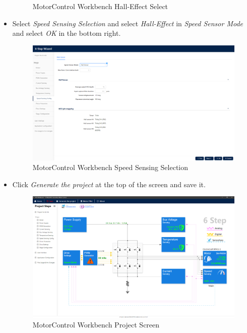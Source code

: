 \documentclass[10pt]{article}
\begin{document}
\begin{itemize}
\begin{figure}[H]
                        \caption{MotorControl Workbench Hall-Effect Select}
                    \end{figure}
                \item Select \emph{Speed Sensing Selection} and select \emph{Hall-Effect} in \emph{Speed Sensor Mode} and select \emph{OK} in the bottom right.
                    \begin{figure}[H]
                        \centerline{\includegraphics[width=\textwidth]{References/MCW 6-step Speed Sensing Selection.png}}
                        \caption{MotorControl Workbench Speed Sensing Selection}
                    \end{figure}
                \item Click \emph{Generate the project} at the top of the screen and save it.
                    \begin{figure}[H]
                        \centerline{\includegraphics[width=\textwidth]{References/MCW Project Screen.png}}
                        \caption{MotorControl Workbench Project Screen}
                    \end{figure}

\end{itemize}
\end{document}
